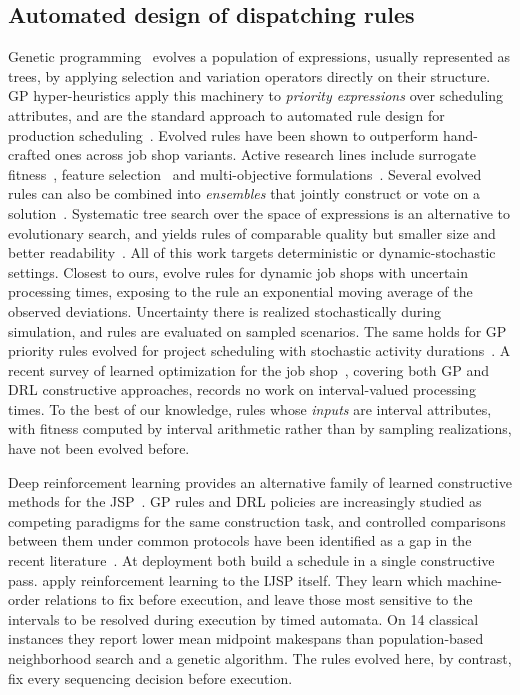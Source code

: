 \documentclass[preprint,number,sort&compress,12pt]{elsarticle}
\begin{document}
\subsection{Automated design of dispatching rules}
Genetic programming~\citep{Koza1992,Poli2008} evolves a population of
expressions, usually represented as trees, by applying selection and
variation operators directly on their structure. GP hyper-heuristics
apply this machinery to \emph{priority expressions} over scheduling
attributes, and are the standard approach to automated rule design for
production scheduling~\citep{Branke2016,Nguyen2017}. Evolved rules have
been shown to outperform hand-crafted ones across job shop variants.
Active research lines include surrogate fitness~\citep{Hildebrandt2015},
feature selection~\citep{Mei2017} and multi-objective
formulations~\citep{Nguyen2014}. Several evolved rules can also be
combined into \emph{ensembles} that jointly construct or vote on a
solution~\citep{GilGala2021Ensembles}. Systematic tree search over the
space of expressions is an alternative to evolutionary search, and
yields rules of comparable quality but smaller size and better
readability~\citep{GilGala2025SSHE}. All of this work targets
deterministic or dynamic-stochastic settings. Closest to ours,
\citet{Karunakaran2017} evolve rules for dynamic job shops with
uncertain processing times, exposing to the rule an exponential moving
average of the observed deviations. Uncertainty there is realized
stochastically during simulation, and rules are evaluated on sampled
scenarios. The same holds for GP priority rules evolved for project
scheduling with stochastic activity durations~\citep{Chen2022HHTGP}. A recent survey of learned optimization for the job
shop~\citep{Xu2025}, covering both GP and DRL constructive approaches,
records no work on interval-valued processing times. To the best of our
knowledge, rules whose \emph{inputs} are interval attributes, with
fitness computed by interval arithmetic rather than by sampling
realizations, have not been evolved before.

Deep reinforcement learning provides an alternative family of learned
constructive methods for the JSP~\citep{Zhang2020L2D,Park2021GNN}. GP
rules and DRL policies are increasingly studied as competing paradigms
for the same construction task, and controlled comparisons between them
under common protocols have been identified as a gap in the recent
literature~\citep{Xu2025}. At deployment both build a schedule in a
single constructive pass. \citet{Han2026RAPO} apply reinforcement
learning to the IJSP itself. They learn which machine-order relations to
fix before execution, and leave those most sensitive to the intervals to
be resolved during execution by timed automata. On 14 classical
instances they report lower mean midpoint makespans than
population-based neighborhood search and a genetic algorithm. The rules
evolved here, by contrast, fix every sequencing decision before
execution.
\end{document}
